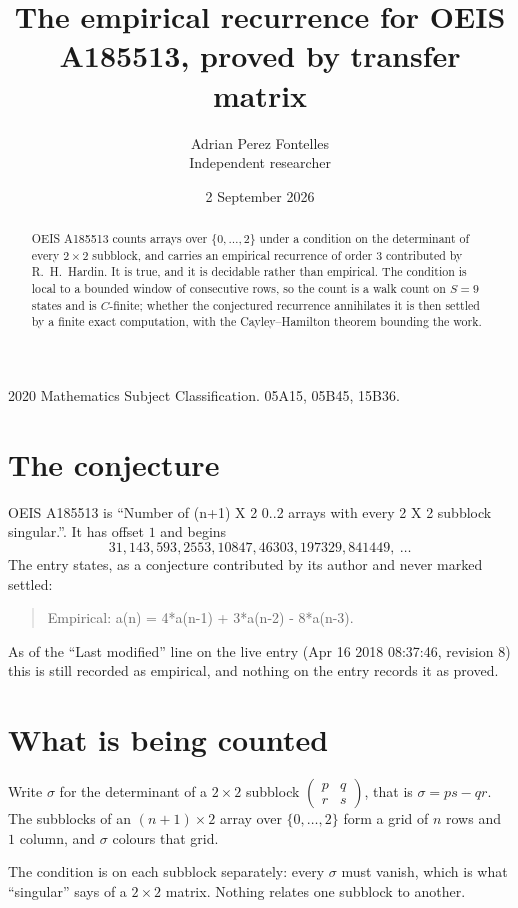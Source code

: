 \documentclass[11pt,a4paper]{article}
\title{The empirical recurrence for OEIS A185513, proved by transfer matrix}
\author{Adrian Perez Fontelles\\ \small Independent researcher}
\date{2 September 2026}
\theoremstyle{plain}
\theoremstyle{definition}
\begin{document}
\maketitle

\begin{abstract}
OEIS A185513 counts arrays over $\{0,\dots,2\}$ under a condition on the determinant of every
$2\times2$ subblock, and carries an empirical recurrence of order $3$ contributed by
R.~H.~Hardin. It is true, and it is decidable rather than empirical. The condition is local to
a bounded window of consecutive rows, so the count is a walk count on $S=9$ states and is
$C$-finite; whether the conjectured recurrence annihilates it is then settled by a finite exact
computation, with the Cayley--Hamilton theorem bounding the work.
\end{abstract}

\noindent\small 2020 Mathematics Subject Classification. 05A15, 05B45, 15B36.\normalsize

\section{The conjecture}

OEIS A185513 is ``Number of (n+1) X 2 0..2 arrays with every 2 X 2 subblock singular.''. It has offset $1$ and begins
\[
31, 143, 593, 2553, 10847, 46303, 197329, 841449,\ \dots
\]
The entry states, as a conjecture contributed by its author and never marked settled:
\begin{quote}
Empirical: a(n) = 4*a(n-1) + 3*a(n-2) - 8*a(n-3).
\end{quote}
As of the ``Last modified'' line on the live entry (Apr 16 2018 08:37:46, revision 8) this is still
recorded as empirical, and nothing on the entry records it as proved.

\section{What is being counted}

Write $\sigma$ for the determinant of a $2\times2$ subblock
$\begin{pmatrix}p&q\\r&s\end{pmatrix}$, that is $\sigma=ps-qr$. The subblocks of an
$(n+1)\times2$ array over $\{0,\dots,2\}$ form a grid of $n$ rows and $1$
column, and $\sigma$ colours that grid.

The condition is on each subblock separately: every $\sigma$ must vanish, which is what
``singular'' says of a $2\times2$ matrix. Nothing
relates one subblock to another.
\end{document}
